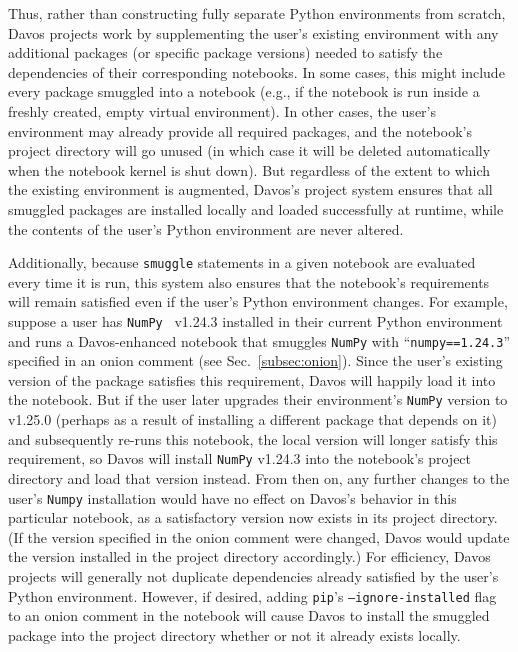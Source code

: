 \documentclass[preprint,12pt,a4paper]{elsarticle}
\begin{document}
Thus, rather than constructing fully separate Python environments from scratch, Davos projects work by supplementing the user's existing environment with any additional packages (or specific package versions) needed to satisfy the dependencies of their corresponding notebooks.
In some cases, this might include every package smuggled into a notebook (e.g., if the notebook is run inside a freshly created, empty virtual environment).
In other cases, the user's environment may already provide all required packages, and the notebook's project directory will go unused (in which case it will be deleted automatically when the notebook kernel is shut down).
But regardless of the extent to which the existing environment is augmented, Davos's project system ensures that all smuggled packages are installed locally and loaded successfully at runtime, while the contents of the user's Python environment are never altered.

Additionally, because \texttt{smuggle} statements in a given notebook are evaluated every time it is run, this system also ensures that the notebook's requirements will remain satisfied even if the user's Python environment changes.
For example, suppose a user has \texttt{NumPy}~\cite{HarrEtal20} v1.24.3 installed in their current Python environment and runs a Davos-enhanced notebook that smuggles \texttt{NumPy} with ``\texttt{numpy==1.24.3}'' specified in an onion comment (see Sec.~\ref{subsec:onion}).
Since the user's existing version of the package satisfies this requirement, Davos will happily load it into the notebook.
But if the user later upgrades their environment's \texttt{NumPy} version to v1.25.0 (perhaps as a result of installing a different package that depends on it) and subsequently re-runs this notebook, the local version will longer satisfy this requirement, so Davos will install \texttt{NumPy} v1.24.3 into the notebook's project directory and load that version instead.
From then on, any further changes to the user's \texttt{Numpy} installation would have no effect on Davos's behavior in this particular notebook, as a satisfactory version now exists in its project directory.
(If the version specified in the onion comment were changed, Davos would update the version installed in the project directory accordingly.)
For efficiency, Davos projects will generally not duplicate dependencies already satisfied by the user's Python environment.
However, if desired, adding \texttt{pip}'s \texttt{--ignore-installed} flag to an onion comment in the notebook will cause Davos to install the smuggled package into the project directory whether or not it already exists locally.
\end{document}
